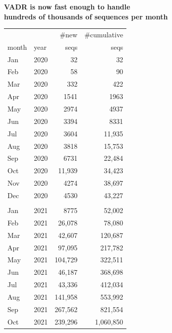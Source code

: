 \documentclass[landscape]{slides}
\begin{document}
\begin{slide}
\begin{center}
\normalsize{\textbf{VADR is now fast enough to handle \\ hundreds of thousands of sequences per month}}
\end{center}

\tiny
\begin{center}
\begin{tabular}{llrr}
          &          &\#new     &\#cumulative\\
month     &year      &seqs      &seqs      \\ \hline
Jan       & 2020     &32        &32        \\ 
Feb       & 2020     &58        &90        \\ 
Mar       & 2020     &332       &422       \\ 
Apr       & 2020     &1541      &1963      \\ 
May       & 2020     &2974      &4937      \\ 
Jun       & 2020     &3394      &8331      \\ 
Jul       & 2020     &3604      &11,935    \\ 
Aug       & 2020     &3818      &15,753    \\ 
Sep       & 2020     &6731      &22,484    \\ 
Oct       & 2020     &11,939    &34,423    \\ 
Nov       & 2020     &4274      &38,697    \\ 
Dec       & 2020     &4530      &43,227    \\ 
& & & \\
Jan       & 2021     &8775      &52,002    \\ 
Feb       & 2021     &26,078    &78,080    \\ 
Mar       & 2021     &42,607    &120,687   \\ 
Apr       & 2021     &97,095    &217,782   \\ 
May       & 2021     &104,729   &322,511   \\ 
Jun       & 2021     &46,187    &368,698   \\ 
Jul       & 2021     &43,336    &412,034   \\ 
Aug       & 2021     &141,958   &553,992   \\ 
Sep       & 2021     &267,562   &821,554   \\ 
Oct       & 2021     &239,296   &1,060,850 \\ 

\end{tabular}
\end{center}
\end{slide}
\end{document}
